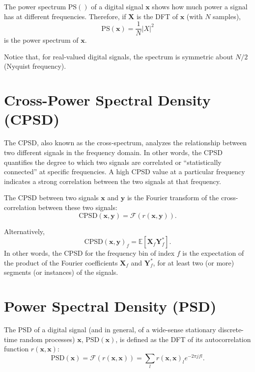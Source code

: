 The power spectrum $\text{PS}()$ of a digital signal $\mathbf{x}$
shows how much power a signal has at different frequencies. Therefore,
if $\mathbf{X}$ is the DFT of $\mathbf{x}$ (with $N$ samples),
\begin{equation}
  \text{PS}(\mathbf{x}) = \frac{1}{N}|X|^2
\end{equation}
is the power spectrum of $\mathbf{x}$.

Notice that, for real-valued digital signals, the spectrum is
symmetric about $N/2$ (Nyquist frequency).


\section{Cross-Power Spectral Density (CPSD)}
\label{sec:CPSD}
The \gls{CPSD}, also known as the cross-spectrum, analyzes the
relationship between two different signals in the frequency domain. In
other words, the \gls{CPSD} quantifies the degree to which two signals
are correlated or ``statistically connected'' at specific
frequencies. A high \gls{CPSD} value at a particular frequency indicates a
strong correlation between the two signals at that frequency.

The \gls{CPSD} between two signals $\mathbf{x}$ and $\mathbf{y}$ is
the Fourier transform of the cross-correlation between these two
signals:
\begin{equation}
  \text{CPSD}(\mathbf{x},\mathbf{y})=\mathcal{F}({r(\mathbf{x},\mathbf{y})}).
\end{equation}

Alternatively,
\begin{equation}
  \text{CPSD}(\mathbf{x},\mathbf{y})_f=\mathbb{E}[\mathbf{X}_f\mathbf{Y}_f^*].
\end{equation}
In other words, the \gls{CPSD} for the frequency bin of index $f$ is
the expectation of the product of the Fourier coefficients
$\mathbf{X}_f$ and $\mathbf{Y}_f^*$, for at least two (or more)
segments (or instances) of the signals.

\section{Power Spectral Density (PSD)}
\label{sec:PSD}

The \gls{PSD} of a digital signal (and in general, of a wide-sense
stationary discrete-time random processes) $\mathbf{x}$,
$\text{PSD}(\mathbf{x})$, is defined as the \gls{DFT} of its
autocorrelation function $r(\mathbf{x},\mathbf{x})$:
\begin{equation}
  \text{PSD}(\mathbf{x}) = \mathcal{F}(r(\mathbf{x},\mathbf{x})) = \sum_l r(\mathbf{x},\mathbf{x})_le^{-2\pi jfl}.
\end{equation}

